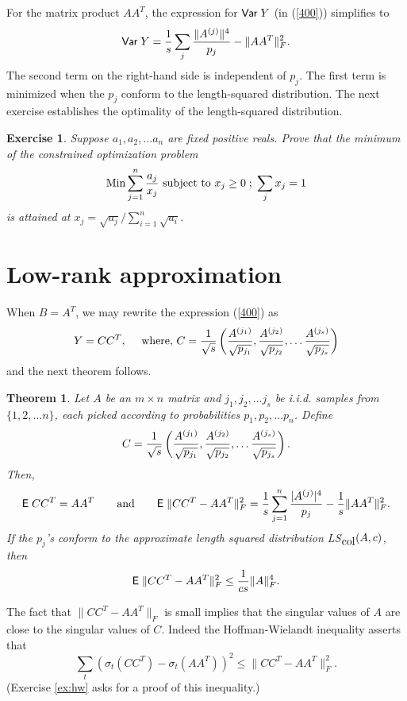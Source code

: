 \documentclass{book}
\newtheorem{theorem}{Theorem}[chapter]
\newtheorem{exercise}{Exercise}
\numberwithin{exercise}{chapter}
\begin{document}
For the matrix product $AA^T$, the expression for $\hbox{\sf Var\;} Y$ (in (\ref{400}))
simplifies to
$$\hbox{\sf Var\;} Y = {1\over s}\sum_j {\|A^{(j)}\|^4\over p_j}-\|AA^T\|_F^2.$$
The second term on the right-hand side is independent of $p_j$.
The first term is minimized when the $p_j$ conform to the length-squared
distribution. The next exercise establishes
the optimality of the length-squared distribution.

\begin{exercise}
Suppose $a_1,a_2,\ldots a_n$ are fixed positive reals. Prove that the minimum
of the constrained optimization problem
$$\hbox{Min} \sum_{j=1}^n {a_j\over x_j}\hbox{  subject to  } x_j\geq 0\; ;\; \sum_j x_j=1$$
is attained at $x_j=\sqrt{a_j}/\sum_{i=1}^n\sqrt{ a_i}$.
\end{exercise}

\section{Low-rank approximation}

When $B=A^T$, we may rewrite the expression (\ref{400}) as
$$Y=CC^T,\quad\hbox{  where,   } C={1\over\sqrt s}\left( {A^{(j_1)}\over \sqrt{p_{j_1}}},{A^{(j_2)}\over \sqrt{p_{j_2}}},\ldots {A^{(j_s)}\over \sqrt{p_{j_s}}}\right)$$
and the next theorem follows.
\begin{theorem}\label{thm:sampleAAT}
Let $A$ be an $m\times n$ matrix and $j_1,j_2,\ldots j_s$ be i.i.d. samples from $\{ 1,2,\ldots n\}$,
each picked according to probabilities $p_1,p_2,\ldots p_n$. Define
$$C={1\over\sqrt s}\left( {A^{(j_1)}\over \sqrt{p_{j_1}}},{A^{(j_2)}\over \sqrt{p_{j_2}}},\ldots {A^{(j_s)}\over \sqrt{p_{j_s}}}\right).$$
Then,
$$\hbox{{\sf E}\;} CC^T=AA^T\qquad \mbox{and}\qquad \hbox{{\sf E}\;} \|CC^T-AA^T\|_F^2 = {1\over s}\sum_{j=1}^n{|A^{(j)}|^4\over p_j}-{1\over s} \|AA^T\|_F^2.$$
If the $p_j$'s conform to the approximate length squared distribution LS$_{\hbox{col}}(A,c)$, then
$$\hbox{{\sf E}\;} \|CC^T-AA^T\|_F^2\leq {1\over cs}\|A\|_F^4.$$
\end{theorem}


The fact that $\|CC^T-AA^T\|_F$ is small implies that the singular values of $A$
are close to the singular values of $C$. Indeed the Hoffman-Wielandt inequality asserts that
\begin{equation}\label{hw}
\sum_t \left( \sigma_t(CC^T)-\sigma_t(AA^T) \right)^2\leq \|CC^T-AA^T\|_F^2.
\end{equation}
(Exercise \ref{ex:hw} asks for a proof of this inequality.)
\end{document}
